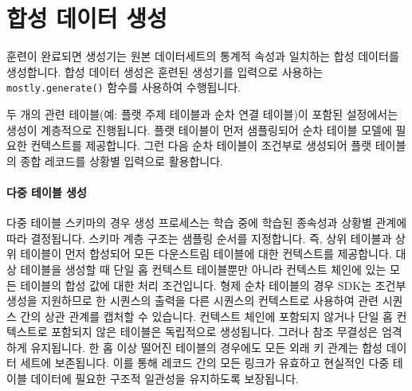 
\section{합성 데이터 생성}
훈련이 완료되면 생성기는 원본 데이터세트의 통계적 속성과 일치하는 합성 데이터를 생성합니다.
합성 데이터 생성은 훈련된 생성기를 입력으로 사용하는 \texttt{mostly.generate()} 함수를 사용하여 수행됩니다.


두 개의 관련 테이블(예: 플랫 주제 테이블과 순차 연결 테이블)이 포함된 설정에서는 생성이 계층적으로 진행됩니다. 플랫 테이블이 먼저 샘플링되어 순차 테이블 모델에 필요한 컨텍스트를 제공합니다. 그런 다음 순차 테이블이 조건부로 생성되어 플랫 테이블의 종합 레코드를 상황별 입력으로 활용합니다.

\paragraph{다중 테이블 생성}
다중 테이블 스키마의 경우 생성 프로세스는 학습 중에 학습된 종속성과 상황별 관계에 따라 결정됩니다. 스키마 계층 구조는 샘플링 순서를 지정합니다. 즉, 상위 테이블과 상위 테이블이 먼저 합성되어 모든 다운스트림 테이블에 대한 컨텍스트를 제공합니다. 대상 테이블을 생성할 때 단일 홉 컨텍스트 테이블뿐만 아니라 컨텍스트 체인에 있는 모든 테이블의 합성 값에 대한 처리 조건입니다. 형제 순차 테이블의 경우 SDK는 조건부 생성을 지원하므로 한 시퀀스의 출력을 다른 시퀀스의 컨텍스트로 사용하여 관련 시퀀스 간의 상관 관계를 캡처할 수 있습니다. 컨텍스트 체인에 포함되지 않거나 단일 홉 컨텍스트로 포함되지 않은 테이블은 독립적으로 생성됩니다. 그러나 참조 무결성은 엄격하게 유지됩니다. 한 홉 이상 떨어진 테이블의 경우에도 모든 외래 키 관계는 합성 데이터 세트에 보존됩니다. 이를 통해 레코드 간의 모든 링크가 유효하고 현실적인 다중 테이블 데이터에 필요한 구조적 일관성을 유지하도록 보장됩니다.

